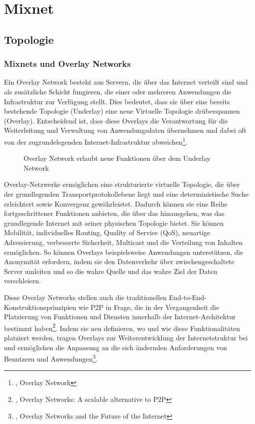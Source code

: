 \section{Mixnet}

\subsection{Topologie}

\subsubsection{Mixnets und Overlay Networks}

Ein Overlay Network besteht aus Servern, die über das Internet verteilt sind und als zusätzliche Schicht fungieren, die einer oder mehreren Anwendungen die Infrastruktur zur Verfügung stellt. Dies bedeutet, dass sie über eine bereits bestehende Topologie (Underlay) eine neue Virtuelle Topologie drüberspannen (Overlay). Entscheidend ist, dass diese Overlays die Verantwortung für die Weiterleitung und Verwaltung von Anwendungsdaten übernehmen und dabei oft von der zugrundelegenden Internet-Infrastruktur abweichen\footnote{\cite{OverlayNetwork}, Overlay Network}.

\begin{figure}[h!]
    \centering
    
    \caption{Overlay Network erlaubt neue Funktionen über dem Underlay Network}
    \label{imgs:overlay_network}
\end{figure}

Overlay-Netzwerke ermöglichen eine strukturierte virtuelle Topologie, die über der grundlegenden Transportprotokollebene liegt und eine deterministische Suche erleichtert sowie Konvergenz gewährleistet. Dadurch können sie eine Reihe fortgeschrittener Funktionen anbieten, die über das hinausgehen, was das grundlegende Internet mit seiner physischen Topologie bietet. Sie können Mobilität, individuelles Routing, Quality of Service (QoS), neuartige Adressierung, verbesserte Sicherheit, Multicast und die Verteilung von Inhalten ermöglichen. So können Overlays beispielsweise Anwendungen unterstützen, die Anonymität erfordern, indem sie den Datenverkehr über zwischengeschaltete Server umleiten und so die wahre Quelle und das wahre Ziel der Daten verschleiern.

Diese Overlay Networks stellen auch die traditionellen End-to-End-Konstruktionsprinzipien wie P2P in Frage, die in der Vergangenheit die Platzierung von Funktionen und Diensten innerhalb der Internet-Architektur bestimmt haben\footnote{\cite{AlternativeToP2P}, Overlay Networks: A scalable alternative to P2P}. Indem sie neu definieren, wo und wie diese Funktionalitäten platziert werden, tragen Overlays zur Weiterentwicklung der Internetstruktur bei und ermöglichen die Anpassung an die sich ändernden Anforderungen von Benutzern und Anwendungen\footnote{\cite{FutureOfTheInternet}, Overlay Networks and the Future of the Internet}.

